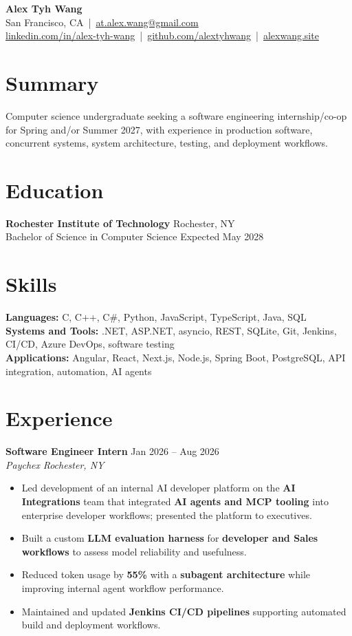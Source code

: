 \documentclass[10pt,letterpaper]{article}
\newif\ifresumeFirstRole
\newcommand{\resumeRole}[4]{%
  \ifresumeFirstRole
    \global\resumeFirstRolefalse
  \else
    \vspace{0pt plus 1fill}%
  \fi
  \textbf{#1} \hfill #2\\
  \textit{#3} \hfill \textit{#4}
}
\begin{document}
\begin{center}
{\Large \textbf{Alex Tyh Wang}}\\
San Francisco, CA \,|\, \href{mailto:at.alex.wang@gmail.com}{at.alex.wang@gmail.com}\\
\small \href{https://www.linkedin.com/in/alex-tyh-wang/}{linkedin.com/in/alex-tyh-wang} \,|\, \href{https://github.com/alextyhwang}{github.com/alextyhwang} \,|\, \href{https://alexwang.site}{alexwang.site}
\end{center}

\section*{Summary}
Computer science undergraduate seeking a software engineering internship/co-op for Spring and/or Summer 2027, with experience in production software, concurrent systems, system architecture, testing, and deployment workflows.

\section*{Education}
\textbf{Rochester Institute of Technology} \hfill Rochester, NY\\
Bachelor of Science in Computer Science \hfill Expected May 2028

\section*{Skills}
\textbf{Languages:} C, C++, C\#, Python, JavaScript, TypeScript, Java, SQL\\
\textbf{Systems and Tools:} .NET, ASP.NET, asyncio, REST, SQLite, Git, Jenkins, CI/CD, Azure DevOps, software testing\\
\textbf{Applications:} Angular, React, Next.js, Node.js, Spring Boot, PostgreSQL, API integration, automation, AI agents

\section*{Experience}
\resumeRole{Software Engineer Intern}{Jan 2026 -- Aug 2026}{Paychex}{Rochester, NY}
\begin{itemize}
  \item Led development of an internal AI developer platform on the \textbf{AI Integrations} team that integrated \textbf{AI agents and MCP tooling} into enterprise developer workflows; presented the platform to executives.
  \item Built a custom \textbf{LLM evaluation harness} for \textbf{developer and Sales workflows} to assess model reliability and usefulness.
  \item Reduced token usage by \textbf{55\%} with a \textbf{subagent architecture} while improving internal agent workflow performance.
  \item Maintained and updated \textbf{Jenkins CI/CD pipelines} supporting automated build and deployment workflows.
\end{itemize}
\end{document}
